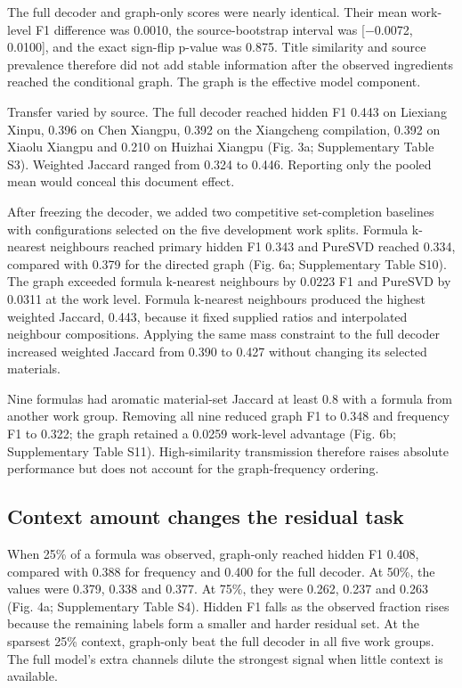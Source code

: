 \documentclass[12pt]{article}
\begin{document}
The full decoder and graph-only scores were nearly identical. Their mean work-level F1 difference was 0.0010, the source-bootstrap interval was [\ensuremath{-}0.0072, 0.0100], and the exact sign-flip p-value was 0.875. Title similarity and source prevalence therefore did not add stable information after the observed ingredients reached the conditional graph. The graph is the effective model component.

Transfer varied by source. The full decoder reached hidden F1 0.443 on Liexiang Xinpu, 0.396 on Chen Xiangpu, 0.392 on the Xiangcheng compilation, 0.392 on Xiaolu Xiangpu and 0.210 on Huizhai Xiangpu (Fig. 3a; Supplementary Table S3). Weighted Jaccard ranged from 0.324 to 0.446. Reporting only the pooled mean would conceal this document effect.

After freezing the decoder, we added two competitive set-completion baselines with configurations selected on the five development work splits. Formula k-nearest neighbours reached primary hidden F1 0.343 and PureSVD reached 0.334, compared with 0.379 for the directed graph (Fig. 6a; Supplementary Table S10). The graph exceeded formula k-nearest neighbours by 0.0223 F1 and PureSVD by 0.0311 at the work level. Formula k-nearest neighbours produced the highest weighted Jaccard, 0.443, because it fixed supplied ratios and interpolated neighbour compositions. Applying the same mass constraint to the full decoder increased weighted Jaccard from 0.390 to 0.427 without changing its selected materials.

Nine formulas had aromatic material-set Jaccard at least 0.8 with a formula from another work group. Removing all nine reduced graph F1 to 0.348 and frequency F1 to 0.322; the graph retained a 0.0259 work-level advantage (Fig. 6b; Supplementary Table S11). High-similarity transmission therefore raises absolute performance but does not account for the graph-frequency ordering.

\subsection*{Context amount changes the residual task}

When 25\% of a formula was observed, graph-only reached hidden F1 0.408, compared with 0.388 for frequency and 0.400 for the full decoder. At 50\%, the values were 0.379, 0.338 and 0.377. At 75\%, they were 0.262, 0.237 and 0.263 (Fig. 4a; Supplementary Table S4). Hidden F1 falls as the observed fraction rises because the remaining labels form a smaller and harder residual set. At the sparsest 25\% context, graph-only beat the full decoder in all five work groups. The full model's extra channels dilute the strongest signal when little context is available.
\end{document}
